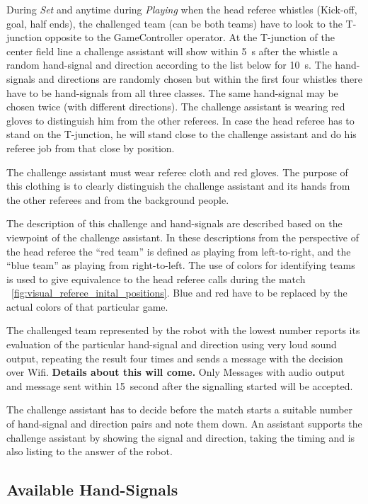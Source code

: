 During \textit{Set} and anytime during \textit{Playing} when the head referee whistles (Kick-off, goal, half ends), the challenged team (can be both teams) have to look to the T-junction opposite to the GameController operator. At the T-junction of the center field line a challenge assistant will show within \qty{5}{\second} after the whistle a random hand-signal and direction according to the list below for \qty{10}{\second}. The hand-signals and directions are randomly chosen but within the first four whistles there have to be hand-signals from all three classes. The same hand-signal may be chosen twice (with different directions). The challenge assistant is wearing red gloves to distinguish him from the other referees. In case the head referee has to stand on the T-junction, he will stand close to the challenge assistant and do his referee job from that close by position.

The challenge assistant must wear referee cloth and red gloves. The purpose of this clothing is to clearly distinguish the challenge assistant and its hands from the other referees and from the background people. 

The description of this challenge and hand-signals are described based on the viewpoint of the challenge assistant. In these descriptions from the perspective of the head referee the ``red team'' is defined as playing from left-to-right, and the ``blue team'' as playing from right-to-left. The use of colors for identifying teams is used to give equivalence to the head referee calls during the match \cf~\cref{fig:visual_referee_inital_positions}. Blue and red have to be replaced by the actual colors of that particular game.

The challenged team represented by the robot with the lowest number reports its evaluation of the particular hand-signal and direction using very loud sound output, repeating the result four times and sends a message with the decision over Wifi. \textbf{Details about this will come.} Only Messages with audio output and message sent within \qty{15}{second} after the signalling started will be accepted.

The challenge assistant has to decide before the match starts a suitable number of hand-signal and direction pairs and note them down. An assistant supports the challenge assistant by showing the signal and direction, taking the timing and is also listing to the answer of the robot.

\subsection{Available Hand-Signals}

